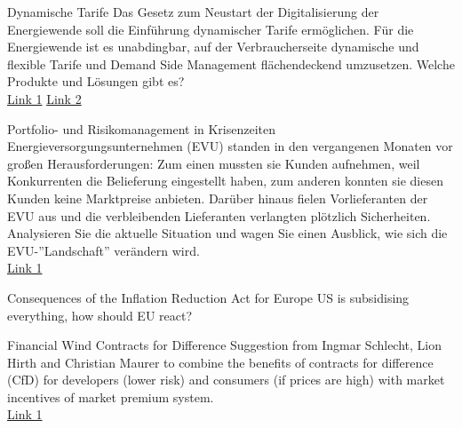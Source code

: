\documentclass[10pt,aspectratio=169,dvipsnames]{beamer}
\begin{document}
\begin{frame}
    \begin{block}{Dynamische Tarife}
    Das Gesetz zum Neustart der Digitalisierung der Energiewende soll die Einführung dynamischer Tarife ermöglichen. Für die Energiewende ist es unabdingbar, auf der Verbraucherseite dynamische und flexible Tarife und Demand Side Management flächendeckend umzusetzen. Welche Produkte und Lösungen gibt es?\\
    \href{https://www.agora-energiewende.de/fileadmin/Projekte/2017/Abgaben_Umlagen/146_Neue-Preismodelle_WEB.pdf}{Link 1}
    \href{https://tibber.com/de}{Link 2}
    \end{block}
    \begin{block}{Portfolio- und Risikomanagement in Krisenzeiten}
    Energieversorgungsunternehmen (EVU) standen in den vergangenen Monaten vor großen Herausforderungen: Zum einen mussten sie Kunden aufnehmen, weil Konkurrenten die Belieferung eingestellt haben, zum anderen konnten sie diesen Kunden keine Marktpreise anbieten. Darüber hinaus fielen Vorlieferanten der EVU aus und die verbleibenden Lieferanten verlangten plötzlich Sicherheiten. Analysieren Sie die aktuelle Situation und wagen Sie einen Ausblick, wie sich die EVU-”Landschaft” verändern wird.\\
    \href{https://www.bafin.de/SharedDocs/Downloads/DE/Rundschreiben/dl_rs1021_MaRisk_Erlaeuterungen.pdf?__blob=publicationFile&v=5}{Link 1}
    \end{block}
\end{frame}

\begin{frame}
    \begin{block}{Consequences of the Inflation Reduction Act for Europe}
    US is subsidising everything, how should EU react?
    \end{block}
    \begin{block}{Financial Wind Contracts for Difference}
    Suggestion from Ingmar Schlecht, Lion Hirth and Christian Maurer to combine the benefits of contracts for difference (CfD) for developers (lower risk) and consumers (if prices are high) with market incentives of market premium system.\\
    \href{http://hdl.handle.net/10419/267597}{Link 1}
    \end{block}
\end{frame}
\end{document}
